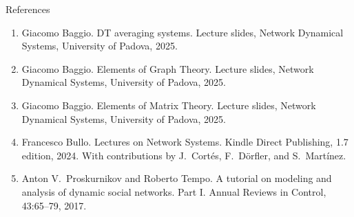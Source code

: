 \begin{frame}[label=bk-refs]{References}
  \small
  \begin{enumerate}
    \item[{[1]}] Giacomo Baggio. DT averaging systems. Lecture slides, Network Dynamical
          Systems, University of Padova, 2025.
    \item[{[2]}] Giacomo Baggio. Elements of Graph Theory. Lecture slides, Network
          Dynamical Systems, University of Padova, 2025.
    \item[{[3]}] Giacomo Baggio. Elements of Matrix Theory. Lecture slides, Network
          Dynamical Systems, University of Padova, 2025.
    \item[{[4]}] Francesco Bullo. Lectures on Network Systems. Kindle Direct Publishing,
          1.7 edition, 2024. With contributions by J.\ Cort\'es, F.\ D\"orfler, and
          S.\ Mart\'inez.
    \item[{[5]}] Anton V.\ Proskurnikov and Roberto Tempo. A tutorial on modeling and
          analysis of dynamic social networks. Part I. Annual Reviews in Control,
          43:65--79, 2017.
  \end{enumerate}
\end{frame}
